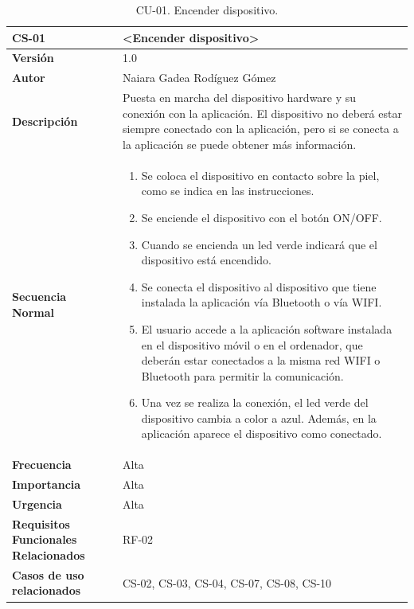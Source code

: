 \begin{table}[h!]
\centering
\begin{tabular}{ |m{3cm}|m{11cm}|  } 
\hline
\cellcolor[HTML]{B9E3F0}\centering\textbf{CS-01} & \cellcolor[HTML]{B9E3F0}\textbf{<Encender dispositivo>}\\

\hline
\cellcolor[HTML]{EFEFEF}\textbf{Versión}             & 1.0  \\
\hline
\cellcolor[HTML]{EFEFEF}\textbf{Autor}                & Naiara Gadea Rodíguez Gómez\\
\hline
\cellcolor[HTML]{EFEFEF}\textbf{Descripción}                & {Puesta en marcha del dispositivo hardware y su conexión con la aplicación. El dispositivo no deberá estar siempre conectado con la aplicación, pero si se conecta a la aplicación se puede obtener más información. }\\
\hline
\cellcolor[HTML]{EFEFEF}\textbf{Secuencia \newline Normal}                &                 
        \begin{enumerate}
			\def\labelenumi{\arabic{enumi}.}
			\tightlist
			\item Se coloca el dispositivo en contacto sobre la piel, como se indica en las instrucciones.
			\item Se enciende el dispositivo con el botón ON/OFF.
                \item Cuando se encienda un led verde indicará que el dispositivo está encendido.  
                \item Se conecta el dispositivo al dispositivo que tiene instalada la aplicación vía Bluetooth o vía WIFI.
                \item El usuario accede a la aplicación software instalada en el dispositivo móvil o en el ordenador, que deberán estar conectados a la misma red WIFI o Bluetooth para permitir la comunicación.  
                \item Una vez se realiza la conexión, el led verde del dispositivo cambia a color a azul. Además, en la aplicación aparece el dispositivo como conectado. 
		\end{enumerate}\\
\hline
\cellcolor[HTML]{EFEFEF}\textbf{Frecuencia}                & Alta\\
\hline
\cellcolor[HTML]{EFEFEF}\textbf{Importancia}                & Alta\\
\hline
\cellcolor[HTML]{EFEFEF}\textbf{Urgencia}                & Alta\\
\hline
\cellcolor[HTML]{EFEFEF}\textbf{Requisitos Funcionales Relacionados}                & {RF-02}\\
\hline
\cellcolor[HTML]{EFEFEF}\textbf{Casos de uso relacionados}                & {CS-02, CS-03, CS-04, CS-07, CS-08, CS-10}\\
\hline
\end{tabular}
\caption{CU-01. Encender dispositivo.}
\end{table}


